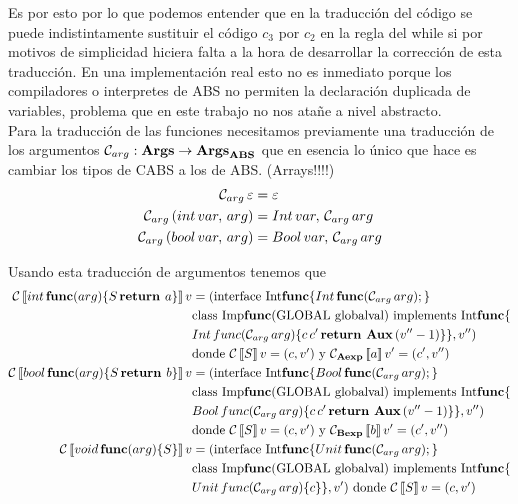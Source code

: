Es por esto por lo que podemos entender que en la traducción del código se puede indistintamente sustituir el código $c_3$ por $c_2$ en la regla del while si por motivos de simplicidad hiciera falta a la hora de desarrollar la corrección de esta traducción. En una implementación real esto no es inmediato porque los compiladores o interpretes de ABS no permiten la declaración duplicada de variables, problema que en este trabajo no nos atañe a nivel abstracto.\\

Para la traducción de las funciones necesitamos previamente una traducción de los argumentos $\mathcal{C}_{arg}: \textbf{Args} \rightarrow \textbf{Args}_{\textbf{ABS}}$ que en esencia lo único que hace es cambiar los tipos de CABS a los de ABS. (Arrays!!!!)
\begin{align*}
  \mathcal{C}_{arg}\,\varepsilon &= \varepsilon\\
  \mathcal{C}_{arg}\, (int \, var,\,arg) &= Int\,var,\,\mathcal{C}_{arg}\, arg\\
  \mathcal{C}_{arg}\, (bool \, var,\,arg) &= Bool\,var,\,\mathcal{C}_{arg}\, arg
\end{align*}

Usando esta traducción de argumentos tenemos que
\begin{align*}
  \mathcal{C}\left\llbracket int\,\textbf{func}(arg)\{S\,\textbf{return } a\} \right\rrbracket v &= (\mbox{interface Int$\textbf{func}$}\{
  \mbox{$Int\, \textbf{func}(\mathcal{C}_{arg}\,arg)\mbox{;\,}$}\}\\
  & \mbox{class Imp$\textbf{func}($GLOBAL globalval$)$ implements Int$\textbf{func}\{$}\\
  & Int\, func(\mathcal{C}_{arg}\,arg) \{ c\,c'\,\textbf{return } \textbf{Aux}\, (v'' - 1)\}\} , v'')\\
  & \mbox{donde $\mathcal{C}\left\llbracket S \right\rrbracket v = (c, v')$ y } \mathcal{C}_{\textbf{Aexp}}\left\llbracket a \right\rrbracket v' = (c', v'')\\
  \mathcal{C}\left\llbracket bool\,\textbf{func}(arg)\{S\,\textbf{return } b\} \right\rrbracket v &= (\mbox{interface Int$\textbf{func}$}\{
  \mbox{$Bool\, \textbf{func}(\mathcal{C}_{arg}\,arg)\mbox{;\,}$}\}\\
  & \mbox{class Imp$\textbf{func}($GLOBAL globalval$)$ implements Int$\textbf{func}\{$}\\
  & Bool\, func(\mathcal{C}_{arg}\,arg) \{ c\,c'\,\textbf{return } \textbf{Aux}\, (v'' - 1)\}\} , v'')\\
  & \mbox{donde $\mathcal{C}\left\llbracket S \right\rrbracket v = (c, v')$ y } \mathcal{C}_{\textbf{Bexp}}\left\llbracket b \right\rrbracket v' = (c', v'')\\
  \mathcal{C}\left\llbracket void\,\textbf{func}(arg)\{S\} \right\rrbracket v &= (\mbox{interface Int$\textbf{func}$}\{
  \mbox{$Unit\, \textbf{func}(\mathcal{C}_{arg}\,arg)\mbox{;\,}$}\}\\
  & \mbox{class Imp$\textbf{func}($GLOBAL globalval$)$ implements Int$\textbf{func}\{$}\\
  & Unit\, func(\mathcal{C}_{arg}\,arg) \{ c \}\} , v')
  \mbox{ donde $\mathcal{C}\left\llbracket S \right\rrbracket v = (c, v')$}
\end{align*}

